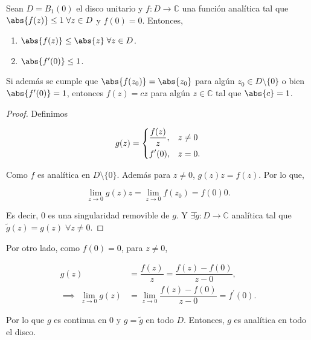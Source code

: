 \documentclass[../main.tex]{subfiles}
\begin{document}
\begin{lemma}[de Schwarz]
    Sean \(D = B_{1}(0)\) el disco unitario y \(f \colon D \to \mathbb{C}\) una función
    analítica tal que \(\abs{f(z)} \leq 1\; \forall z\in D\) y \(f(0) = 0\). Entonces,

    \begin{enumerate}
        \item \(\abs{f(z)} \leq \abs{z}\; \forall z\in D\).
        \item \(\abs{f^{\prime}(0)} \leq 1\).
    \end{enumerate}

    Si además se cumple que \(\abs{f(z_{0})} = \abs{z_{0}}\) para algún \(z_{0}\in
    D\setminus \{0\}\) o bien \(\abs{f^{\prime}(0)} = 1\), entonces \(f(z) =
    cz\) para algún
    \(z\in \mathbb{C}\) tal que \(\abs{c} = 1\).
\end{lemma}

\begin{proof}
    Definimos

    \begin{equation*}
        g(z) =
        \begin{dcases}
            \dfrac{f(z)}{z}, & z \neq 0\\
            f^{\prime}(0), & z = 0.
        \end{dcases}
    \end{equation*}

    Como \(f\) es analítica en \(D\setminus \{0\}\). Además para \(z \neq
    0\), \(g(z) z =
    f(z)\). Por lo que,

    \begin{equation*}
        \lim_{z \to 0} g(z) z = \lim_{z \to 0} f(z_{0}) = f(0) 0.
    \end{equation*}

    Es decir, \(0\) es una singularidad removible de \(g\). Y \(\exists
        \tilde{g} \colon D
    \to \mathbb{C}\) analítica tal que \(\tilde{g}(z) = g(z)\; \forall z \neq 0\).
\end{proof}

Por otro lado, como \(f(0) = 0\), para \(z \neq 0\),

\begin{align*}
    g(z) &= \dfrac{f(z)}{z} = \dfrac{f(z) - f(0)}{z - 0},\\
    \implies\;\lim_{z \to 0} g(z) &= \lim_{z \to 0} \dfrac{f(z) - f(0)}{z -
    0} = f^{\prime}(0).
\end{align*}

Por lo que \(g\) es continua en 0 y \(g = \tilde{g}\) en todo \(D\). Entonces, \(g\) es
analítica en todo el disco.
\end{document}
